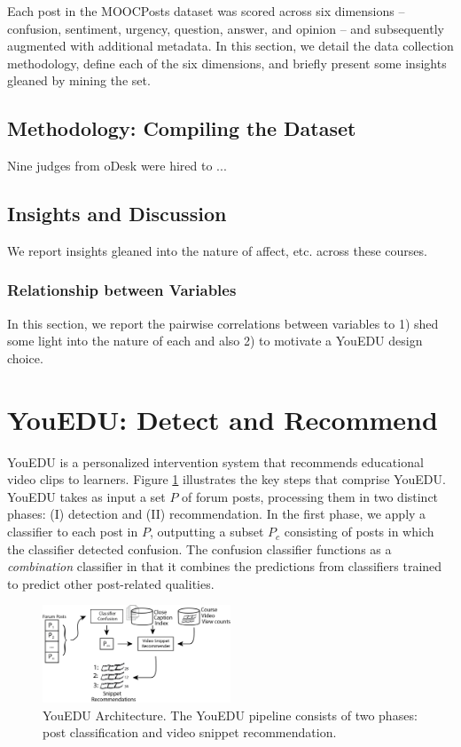 \documentclass{edm_template}
\begin{document}
Each post in the MOOCPosts dataset was scored across six dimensions -- confusion, sentiment, urgency, question, answer, and opinion -- and subsequently augmented with additional metadata. In this section, we detail the data collection methodology, define each of the six dimensions, and briefly present some insights gleaned by mining the set.


\subsection{Methodology: Compiling the Dataset}
Nine judges from oDesk were hired to ...

\subsection{Insights and Discussion}
We report insights gleaned into the nature of affect, etc. across these courses.

\subsubsection{Relationship between Variables}
In this section, we report the pairwise correlations between variables to 1) shed some light into the nature of each and also 2) to motivate a YouEDU design choice.

\section{YouEDU: Detect and Recommend}

YouEDU is a personalized intervention system that recommends educational video clips to learners. Figure \ref{figure:architecture} illustrates the key steps that comprise YouEDU. YouEDU takes as input a set $P$ of forum posts, processing them in two distinct phases: (I) detection and (II) recommendation. In the first phase, we apply a classifier to each post in $P$, outputting a subset $P_{c}$ consisting of posts in which the classifier detected confusion. The confusion classifier functions as a \emph{combination} classifier in that it combines the predictions from classifiers trained to predict other post-related qualities.

\begin{figure}[ht]
       \centering
       \includegraphics[width=0.5\textwidth]{../Figs/youEduArch.png}
       \caption{\textnormal{YouEDU Architecture. The YouEDU pipeline consists of two phases: post classification and video snippet recommendation.}}
       \label{figure:architecture}
\end{figure}
\end{document}
